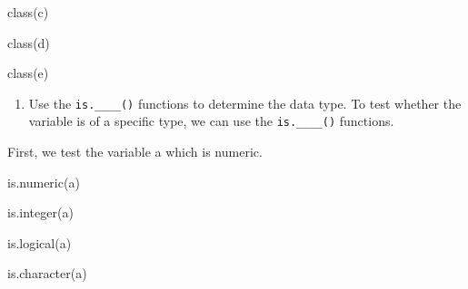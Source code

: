 \documentclass[
  letterpaper,
  DIV=11,
  numbers=noendperiod]{scrreprt}
\newenvironment{Shaded}{}{}
\newcommand{\FunctionTok}[1]{\textcolor[rgb]{0.44,0.26,0.76}{#1}}
\newcommand{\NormalTok}[1]{\textcolor[rgb]{0.14,0.16,0.18}{#1}}
\providecommand{\tightlist}{%
  \setlength{\itemsep}{0pt}\setlength{\parskip}{0pt}}\usepackage{longtable,booktabs,array}
\begin{document}
\begin{Shaded}
\begin{Highlighting}[]
\FunctionTok{class}\NormalTok{(c)}
\end{Highlighting}
\end{Shaded}

\begin{Shaded}
\begin{Highlighting}[]
\FunctionTok{class}\NormalTok{(d)}
\end{Highlighting}
\end{Shaded}

\begin{Shaded}
\begin{Highlighting}[]
\FunctionTok{class}\NormalTok{(e)}
\end{Highlighting}
\end{Shaded}

\begin{enumerate}
\def\labelenumi{\arabic{enumi}.}
\setcounter{enumi}{2}
\tightlist
\item
  Use the \texttt{is.\_\_\_\_()} functions to determine the data type.
  To test whether the variable is of a specific type, we can use the
  \texttt{is.\_\_\_\_()} functions.
\end{enumerate}

First, we test the variable a which is numeric.

\begin{Shaded}
\begin{Highlighting}[]
\FunctionTok{is.numeric}\NormalTok{(a)}
\end{Highlighting}
\end{Shaded}

\begin{Shaded}
\begin{Highlighting}[]
\FunctionTok{is.integer}\NormalTok{(a)}
\end{Highlighting}
\end{Shaded}

\begin{Shaded}
\begin{Highlighting}[]
\FunctionTok{is.logical}\NormalTok{(a)}
\end{Highlighting}
\end{Shaded}

\begin{Shaded}
\begin{Highlighting}[]
\FunctionTok{is.character}\NormalTok{(a)}
\end{Highlighting}
\end{Shaded}
\end{document}
